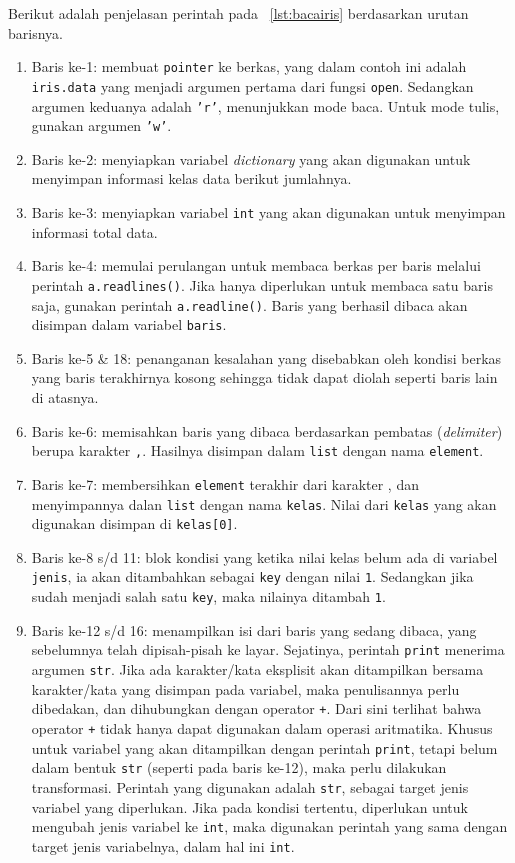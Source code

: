 Berikut adalah penjelasan perintah pada \lstlistingname~\ref{lst:bacairis} berdasarkan urutan barisnya.
\begin{enumerate}
  \item Baris ke-1: membuat \texttt{pointer} ke berkas, yang dalam contoh ini adalah \texttt{iris.data} yang menjadi argumen pertama dari fungsi \texttt{open}. Sedangkan argumen keduanya adalah \texttt{'r'}, menunjukkan mode baca. Untuk mode tulis, gunakan argumen \texttt{'w'}.
  \item Baris ke-2: menyiapkan variabel \textit{dictionary} yang akan digunakan untuk menyimpan informasi kelas data berikut jumlahnya.
  \item Baris ke-3: menyiapkan variabel \texttt{int} yang akan digunakan untuk menyimpan informasi total data.
  \item Baris ke-4: memulai perulangan untuk membaca berkas per baris melalui perintah \texttt{a.readlines()}. Jika hanya diperlukan untuk membaca satu baris saja, gunakan perintah \texttt{a.readline()}. Baris yang berhasil dibaca akan disimpan dalam variabel \texttt{baris}.
  \item Baris ke-5 \& 18: penanganan kesalahan yang disebabkan oleh kondisi berkas yang baris terakhirnya kosong sehingga tidak dapat diolah seperti baris lain di atasnya.
  \item Baris ke-6: memisahkan baris yang dibaca berdasarkan pembatas (\textit{delimiter}) berupa karakter \texttt{,}. Hasilnya disimpan dalam \texttt{list} dengan nama \texttt{element}.
  \item Baris ke-7: membersihkan \texttt{element} terakhir dari karakter , dan menyimpannya dalan \texttt{list} dengan nama \texttt{kelas}. Nilai dari \texttt{kelas} yang akan digunakan disimpan di \texttt{kelas[0]}.
  \item Baris ke-8 s/d 11: blok kondisi yang ketika nilai kelas belum ada di variabel \texttt{jenis}, ia akan ditambahkan sebagai \texttt{key} dengan nilai \texttt{1}. Sedangkan jika sudah menjadi salah satu \texttt{key}, maka nilainya ditambah \texttt{1}.
  \item Baris ke-12 s/d 16: menampilkan isi dari baris yang sedang dibaca, yang sebelumnya telah dipisah-pisah ke layar. Sejatinya, perintah \texttt{print} menerima argumen \texttt{str}. Jika ada karakter/kata eksplisit akan ditampilkan bersama karakter/kata yang disimpan pada variabel, maka penulisannya perlu dibedakan, dan dihubungkan dengan operator \texttt{+}. Dari sini terlihat bahwa operator \texttt{+} tidak hanya dapat digunakan dalam operasi aritmatika. Khusus untuk variabel yang akan ditampilkan dengan perintah \texttt{print}, tetapi belum dalam bentuk \texttt{str} (seperti pada baris ke-12), maka perlu dilakukan transformasi. Perintah yang digunakan adalah \texttt{str}, sebagai target jenis variabel yang diperlukan. Jika pada kondisi tertentu, diperlukan untuk mengubah jenis variabel ke \texttt{int}, maka digunakan perintah yang sama dengan target jenis variabelnya, dalam hal ini \texttt{int}.

\end{enumerate}
